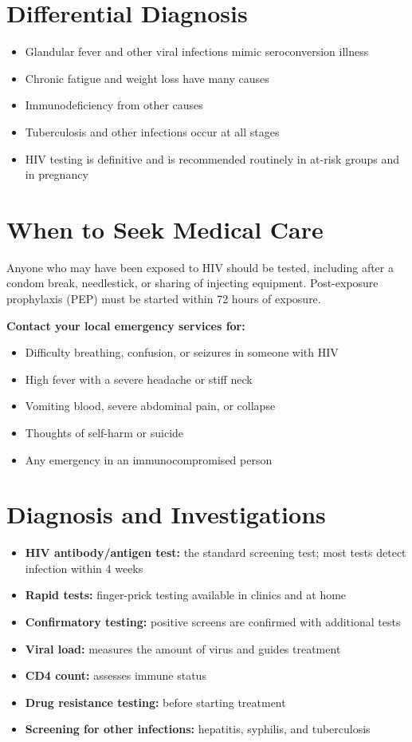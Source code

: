 \section*{Differential Diagnosis}
\begin{itemize}
    \item Glandular fever and other viral infections mimic seroconversion illness
    \item Chronic fatigue and weight loss have many causes
    \item Immunodeficiency from other causes
    \item Tuberculosis and other infections occur at all stages
    \item HIV testing is definitive and is recommended routinely in at-risk groups and in pregnancy
\end{itemize}

\section*{When to Seek Medical Care}
Anyone who may have been exposed to HIV should be tested, including after a condom break, needlestick, or sharing of injecting equipment. Post-exposure prophylaxis (PEP) must be started within 72 hours of exposure.

\textbf{Contact your local emergency services for:}
\begin{itemize}
    \item Difficulty breathing, confusion, or seizures in someone with HIV
    \item High fever with a severe headache or stiff neck
    \item Vomiting blood, severe abdominal pain, or collapse
    \item Thoughts of self-harm or suicide
    \item Any emergency in an immunocompromised person
\end{itemize}

\section*{Diagnosis and Investigations}
\begin{itemize}
    \item \textbf{HIV antibody/antigen test:} the standard screening test; most tests detect infection within 4 weeks
    \item \textbf{Rapid tests:} finger-prick testing available in clinics and at home
    \item \textbf{Confirmatory testing:} positive screens are confirmed with additional tests
    \item \textbf{Viral load:} measures the amount of virus and guides treatment
    \item \textbf{CD4 count:} assesses immune status
    \item \textbf{Drug resistance testing:} before starting treatment
    \item \textbf{Screening for other infections:} hepatitis, syphilis, and tuberculosis
\end{itemize}

